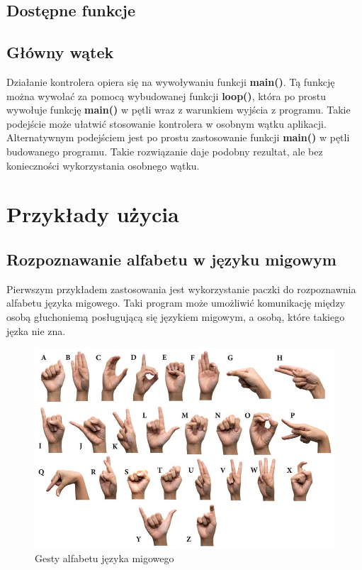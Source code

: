 \subsection{Dostępne funkcje}

\subsection{Główny wątek}
\quad Działanie kontrolera opiera się na wywoływaniu funkcji \textbf{main()}. Tą funkcję można wywołać za pomocą wybudowanej funkcji \textbf{loop()}, która po prostu wywołuje funkcję \textbf{main()} w pętli wraz z warunkiem wyjścia z programu. Takie podejście może ułatwić stosowanie kontrolera w osobnym wątku aplikacji. 
\quad Alternatywnym podejściem jest po prostu zastosowanie funkcji \textbf{main()} w pętli budowanego programu. Takie rozwiązanie daje podobny rezultat, ale bez konieczności wykorzystania osobnego wątku. 

\section{Przykłady użycia}
\subsection{Rozpoznawanie alfabetu w języku migowym}
\quad Pierwszym przykładem zastosowania jest wykorzystanie paczki do rozpoznawnia alfabetu języka migowego. Taki program może umożliwić komunikację między osobą głuchoniemą posługującą się językiem migowym, a osobą, które takiego jęzka nie zna. 


\begin{figure}[H]
    \begin{center}
        \includegraphics[width=15cm]{../images/american_sign_language.jpg}
        \caption{Gesty alfabetu języka migowego}
    \end{center}
\end{figure}

